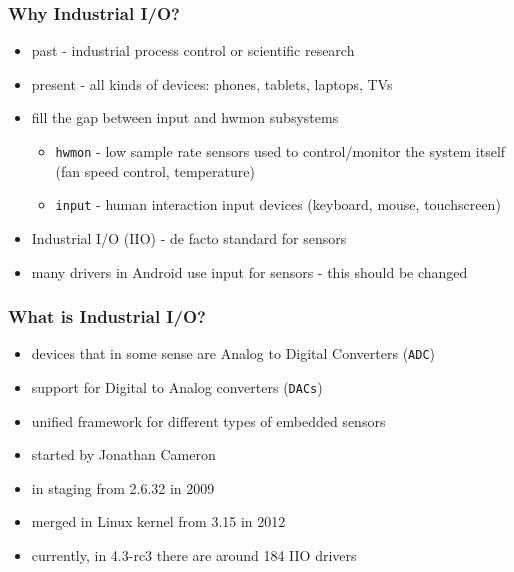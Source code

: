 \documentclass[aspectratio=169]{beamer}
\begin{document}
\begin{frame}
\frametitle{Why Industrial I/O?}
\begin{itemize}
\item past - industrial process control or scientific research
\item present - all kinds of devices: phones, tablets, laptops, TVs
\item fill the gap between input and hwmon subsystems
    \begin{itemize}
    \item \texttt{hwmon} - low sample rate sensors used to control/monitor the system itself (fan speed control, temperature)
        \item \texttt{input} - human interaction input devices (keyboard, mouse, touchscreen)
    \end{itemize}
    \item Industrial I/O (IIO) - de facto standard for sensors
    \item many drivers in Android use input for sensors - this should be changed
\end{itemize}
\end{frame}




\begin{frame}
\frametitle{What is Industrial I/O?}
\begin{itemize}
    \item devices that in some sense are Analog to Digital Converters (\texttt{ADC})
    \item support for Digital to Analog converters (\texttt{DACs})
    \item unified framework for different types of embedded sensors
    \item started by Jonathan Cameron
    \item in staging from 2.6.32 in 2009
    \item merged in Linux kernel from 3.15 in 2012
    \item currently, in 4.3-rc3 there are around 184 IIO drivers
\end{itemize}
\end{frame}
\end{document}
